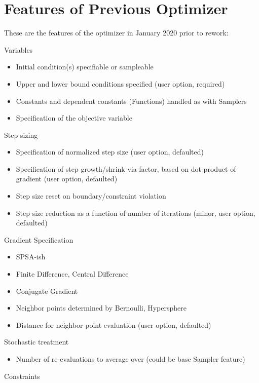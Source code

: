 \documentclass[11pt]{article}
\begin{document}
\section{Features of Previous Optimizer}
These are the features of the optimizer in January 2020 prior to rework:
\begin{section}
  \item Variables
    \begin{itemize}
      \item Initial condition(s) specifiable or sampleable
      \item Upper and lower bound conditions specified (user option, required)
      \item Constants and dependent constants (Functions) handled as with Samplers
      \item Specification of the objective variable
    \end{itemize}
  \item Step sizing
    \begin{itemize}
      \item Specification of normalized step size (user option, defaulted)
      \item Specification of step growth/shrink via factor, based on dot-product of gradient (user option, defaulted)
      \item Step size reset on boundary/constraint violation
      \item Step size reduction as a function of number of iterations (minor, user option, defaulted)
    \end{itemize}
  \item Gradient Specification
    \begin{itemize}
      \item SPSA-ish
      \item Finite Difference, Central Difference
      \item Conjugate Gradient
      \item Neighbor points determined by Bernoulli, Hypersphere
      \item Distance for neighbor point evaluation (user option, defaulted)
    \end{itemize}
  \item Stochastic treatment
    \begin{itemize}
      \item Number of re-evaluations to average over (could be base Sampler feature)
    \end{itemize}
  \item Constraints

\end{section}
\end{document}
